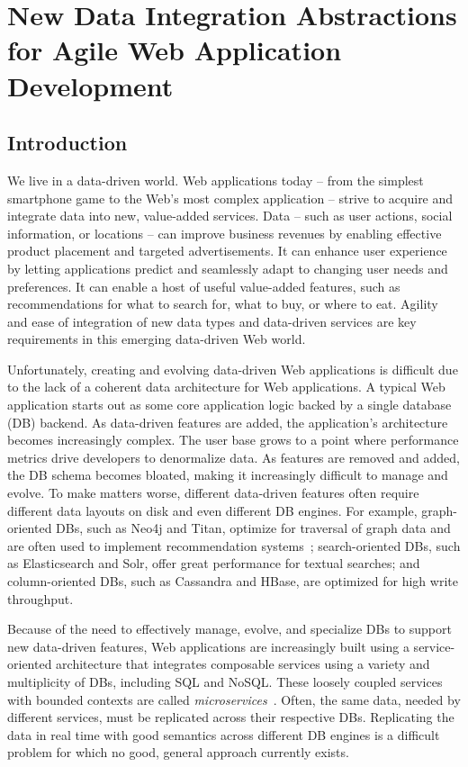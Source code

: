 \chapter{New Data Integration Abstractions for Agile Web Application Development}
\label{ch:synapse}

\section{Introduction}
\label{sec:intro}

We live in a data-driven world. Web applications today -- from
the simplest smartphone game to the Web's most complex application -- strive to
acquire and integrate data into new, value-added services. Data -- such as user
actions, social information, or locations -- can improve business revenues by
enabling effective product placement and targeted advertisements. It can enhance
user experience by letting applications predict and seamlessly adapt to changing
user needs and preferences. It can enable a host of useful
value-added features, such as recommendations for what to search for, what to
buy, or where to eat. Agility and ease of integration of new data
types and data-driven services are key requirements in this emerging data-driven
Web world.

Unfortunately, creating and evolving data-driven Web applications is
difficult due to the lack of a coherent data architecture for
Web applications. A typical Web application starts out as some core
application logic backed by a single database (DB) backend.
As data-driven features are added, the application's architecture becomes increasingly complex.
The user base grows to a point where performance metrics drive developers to
denormalize data. As features are removed and added, the DB schema becomes
bloated, making it increasingly difficult to manage and evolve.
To make matters worse, different data-driven features often require different
data layouts on disk and even different DB engines.
For example, graph-oriented DBs, such as Neo4j and Titan, optimize for
traversal of graph data and are often used to implement recommendation
systems~\cite{db-revolution}; search-oriented DBs, such as
Elasticsearch and Solr, offer great performance for textual searches; and
column-oriented DBs, such as Cassandra and HBase,
are optimized for high write throughput.

Because of the need to effectively manage, evolve, and specialize
DBs to support new data-driven features, Web applications
are increasingly built using a service-oriented architecture that
integrates composable services using a variety and multiplicity of
DBs, including SQL and NoSQL.
These loosely coupled services with bounded contexts are called {\em
microservices}~\cite{books/microservices}.
Often, the same data, needed by different services, must be replicated across
their respective DBs.
Replicating the data in real time with good semantics across different DB
engines is a difficult problem for which no good, general approach currently
exists.

